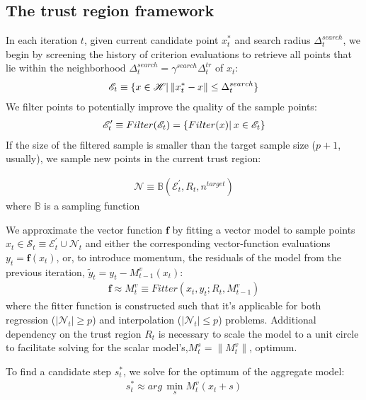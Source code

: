 
\subsection{The trust region framework}
\label{subsec:tr-framework}
In each iteration $t$, given current candidate point $x^*_t$ and search radius $\Delta^{search}_t$, we begin by screening the history of criterion evaluations to retrieve all points that lie within the neighborhood $\Delta^{search}_t=\gamma^{search}\Delta_t^{tr}$ of $x_t$:
\begin{align}
    \mathscr{E}_t\equiv\{x\in\mathscr{H}|\hspace{0.2em}\lVert x^*_t-x\rVert\leq\Delta^{search}_t\}
    \label{eq:hist-search}
\end{align}
We filter points to potentially improve the quality of the sample points:
\begin{align}
    \mathscr{E}'_t\equiv Filter (\mathscr{E}_t) = \{ Filter (x)|\hspace{0.2em} x\in \mathscr{E}_t\}
    \label{eq:filtering}
\end{align}
If the size of the filtered sample is smaller than the target sample size ($p+1$, usually), we sample new points in the current trust region:

\begin{align}
    \mathcal{N}\equiv\mathbb{B}(\mathcal{E}_t^{'},R_t,n^{target})
\end{align}
where $\mathbb{B}$ is a sampling function

We approximate the vector function $\mathbf{f}$ by fitting a vector model to sample points $x_t\in\mathcal{S}_t\equiv\mathcal{E}^{'}_t\cup\mathcal{N}_t$ and either the corresponding vector-function evaluations $y_t=\mathbf{f}(x_t)$, or, to introduce momentum, the residuals of the model from the previous iteration, $\tilde{y}_t =y_t-M_{t-1}^v(x_t)$:
\begin{align}
    \mathbf{f}\approx M_t^v\equiv Fitter(x_t,y_t;R_t,M_{t-1}^v)
\end{align}
where the fitter function is constructed such that it's applicable for both regression ($|\mathcal{N}_t|\geq p$) and interpolation ($|\mathcal{N}_t|\leq p$) problems. Additional dependency on the trust region $R_t$ is necessary to scale the model to a unit circle to facilitate solving for the scalar model's,$M_t^s = \lVert M_t^v\rVert$, optimum.

To find a candidate step $s^{*}_t$, we solve for the optimum of the aggregate model:
\begin{align}
    s^*_t\approx arg\,\min\limits_sM_t^v(x_t+s)
    \label{eq:cand-step}
\end{align}


